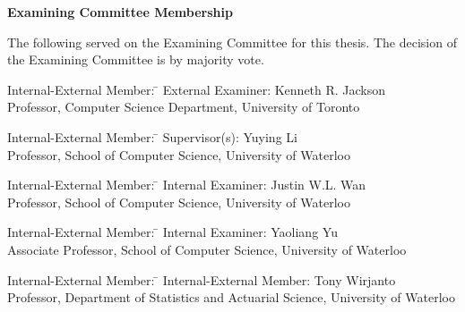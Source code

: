 \cleardoublepage %


\begin{center}\textbf{Examining Committee Membership}\end{center}
  \noindent
The following served on the Examining Committee for this thesis. The decision of the Examining Committee is by majority vote.
  \bigskip

  \noindent
\begin{tabbing}
Internal-External Member: \=  \kill %
External Examiner: \>  Kenneth R. Jackson \\
\> Professor, Computer Science Department, University of Toronto \\
\end{tabbing}
  \bigskip

  \noindent
\begin{tabbing}
Internal-External Member: \=  \kill %
Supervisor(s): \> Yuying Li \\
\> Professor, School of Computer Science, University of Waterloo \\
\end{tabbing}
  \bigskip

  \noindent
  \begin{tabbing}
Internal-External Member: \=  \kill %
Internal Examiner: \>  Justin W.L. Wan \\
\> Professor, School of Computer Science, University of Waterloo \\
\end{tabbing}
  \bigskip


  \begin{tabbing}
Internal-External Member: \=  \kill %
Internal Examiner: \>  Yaoliang Yu \\
\> Associate Professor, School of Computer Science, University of Waterloo \\
\end{tabbing}
  \bigskip
  \noindent
\begin{tabbing}
Internal-External Member: \=  \kill %
Internal-External Member: \> Tony Wirjanto \\
\> Professor, Department of Statistics and Actuarial Science, University of Waterloo \\
\end{tabbing}
  \bigskip

